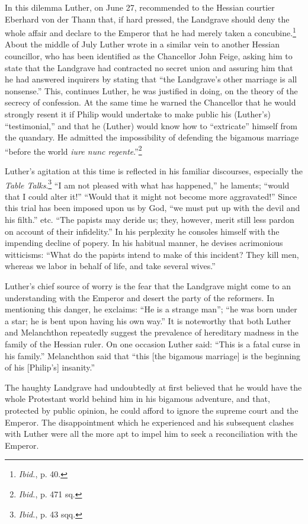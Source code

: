 In this dilemma Luther, on June 27, recommended to the Hessian
courtier Eberhard von der Thann that, if hard pressed, the Landgrave
should deny the whole affair and declare to the Emperor that he had
merely taken a concubine.\footnote{\textit{Ibid.}, p. 40.}
 About the middle of July Luther wrote
in a similar vein to another Hessian councillor, who has been identified
as the Chancellor John Feige, asking him to state that the Landgrave had
contracted no secret union and assuring him that he had
answered inquirers by stating that “the Landgrave’s other marriage is
all nonsense.” This, continues Luther, he was justified in doing, on
the theory of the secrecy of confession. At the same time he warned
the Chancellor that he would strongly resent it if Philip would undertake
to make public his (Luther’s) “testimonial,” and that he (Luther) would
know how to ``extricate'' himself from the quandary. He
admitted the impossibility of defending the bigamous marriage “before
the world \textit{iure nunc regente}.”\footnote{\textit{Ibid.}, p. 471 sq.}


Luther’s agitation at this time is reflected in his familiar discourses,
especially the \textit{Table Talks}.\footnote{\textit{Ibid.}, p. 43 sqq.}
“I am not pleased with what has happened,” he
laments; “would that I could alter it!” “Would that it might not become
more aggravated!” Since this trial has been imposed upon us by God, “we
must put up with the devil and his filth.” etc. “The papists may deride us;
they, however, merit still less pardon on account of their infidelity.” In his
perplexity he consoles himself with the impending decline of popery. In his
habitual manner, he devises acrimonious witticisms: “What do the papists
intend to make of this incident? They kill men, whereas we labor in behalf
of life, and take several wives.”

Luther’s chief source of worry is the fear that the Landgrave might come
to an understanding with the Emperor and desert the party of the reformers.
In mentioning this danger, he exclaims: “He is a strange man”; “he was born
under a star; he is bent upon having his own way.” It is noteworthy that
both Luther and Melanchthon repeatedly suggest the prevalence of hereditary
madness in the family of the Hessian ruler. On one occasion Luther
said: “This is a fatal curse in his family.” Melanchthon said that “this [the
bigamous marriage] is the beginning of his [Philip’s] insanity.”

The haughty Landgrave had undoubtedly at first believed that he would
have the whole Protestant world behind him in his bigamous adventure, and
that, protected by public opinion, he could afford to ignore the supreme
court and the Emperor. The disappointment which he experienced and his
subsequent clashes with Luther were all the more apt to impel him to seek
a reconciliation with the Emperor.

